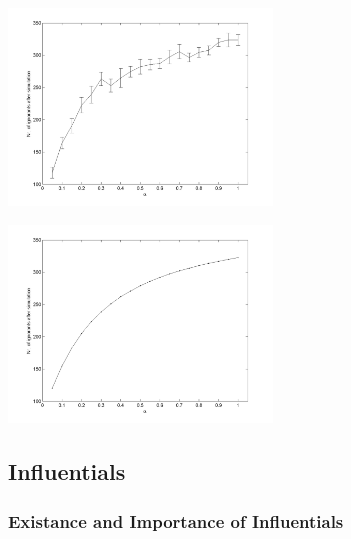 \begin{minipage}{0.5\textwidth}
\includegraphics[width=7cm]{Analysis_pforget}
\label{Analysis_pforget}
\end{minipage}
\begin{minipage}{0.5\textwidth}
\includegraphics[width=7cm]{Analysis_pforget_ODE}
\label{Analysis_pforget_ODE}
\end{minipage}


\subsection{Influentials}

\subsubsection{Existance and Importance of Influentials}

